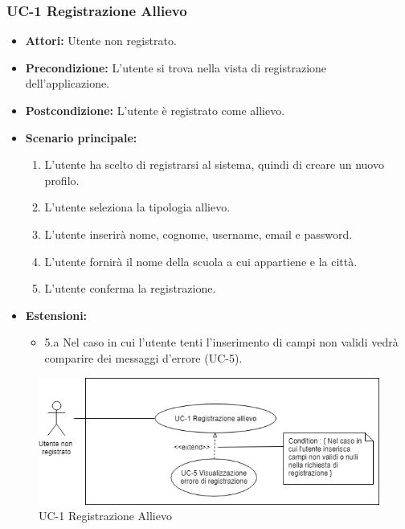 \subsubsection{UC-1 Registrazione Allievo}
\begin{itemize}
		\item \textbf{Attori: }Utente non registrato.
		\item \textbf{Precondizione: }L'utente si trova nella vista di registrazione dell'applicazione.
		\item \textbf{Postcondizione: }L'utente è registrato come allievo.
		\item \textbf{Scenario principale: }
		\begin{enumerate}
		\item L'utente ha scelto di registrarsi al sistema, quindi di creare un nuovo profilo. 
		\item L'utente seleziona la tipologia allievo. 
		\item L'utente inserirà nome, cognome, username, email e password.
		\item L'utente fornirà il nome della scuola a cui appartiene e la città.
		\item L'utente conferma la registrazione.
		\end{enumerate}
		\item \textbf{Estensioni: }
		\begin{itemize}
			\item 5.a Nel caso in cui l'utente tenti l'inserimento di campi non validi vedrà comparire dei messaggi d'errore (UC-5).
		\end{itemize}
\end{itemize}
\begin{figure}[h]
	\centering
	\includegraphics[scale=0.7]{images/UC-1_a.png}
	\caption{UC-1 Registrazione Allievo}
\end{figure}

